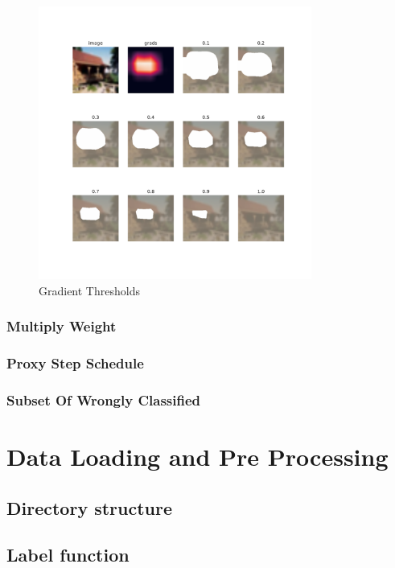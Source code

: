 \begin{figure}[h]
    \centering
    \includegraphics[width=0.8\textwidth]{images/grad_threshold.pdf}
	\caption{Gradient Thresholds}
    \label{fig:thresholds}
\end{figure}

\subsubsection{Multiply Weight}

\subsubsection{Proxy Step Schedule}

\subsubsection{Subset Of Wrongly Classified}

\section{Data Loading and Pre Processing}
\subsection{Directory structure}

\subsection{Label function}

